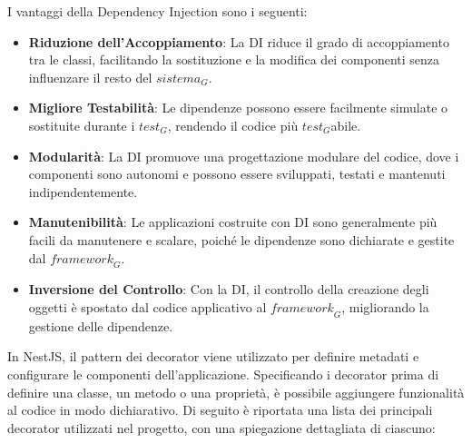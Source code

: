 \newpage
I vantaggi della Dependency Injection sono i seguenti:
\begin{itemize}
\item \textbf{Riduzione dell'Accoppiamento}: La DI riduce il grado di accoppiamento tra le classi, facilitando la sostituzione e la modifica dei componenti senza influenzare il resto del $\textit{sistema}_G$.
\item \textbf{Migliore Testabilità}: Le dipendenze possono essere facilmente simulate o sostituite durante i $\textit{test}_G$, rendendo il codice più $\textit{test}_G$abile.
\item \textbf{Modularità}: La DI promuove una progettazione modulare del codice, dove i componenti sono autonomi e possono essere sviluppati, testati e mantenuti indipendentemente.
\item \textbf{Manutenibilità}: Le applicazioni costruite con DI sono generalmente più facili da manutenere e scalare, poiché le dipendenze sono dichiarate e gestite dal $\textit{framework}_G$.
\item \textbf{Inversione del Controllo}: Con la DI, il controllo della creazione degli oggetti è spostato dal codice applicativo al $\textit{framework}_G$, migliorando la gestione delle dipendenze.
\end{itemize}

In NestJS, il pattern dei decorator viene utilizzato per definire metadati e configurare le componenti dell'applicazione. Specificando i decorator prima di definire una classe, un metodo o una proprietà, è possibile aggiungere funzionalità al codice in modo dichiarativo. Di seguito è riportata una lista dei principali decorator utilizzati nel progetto, con una spiegazione dettagliata di ciascuno:

